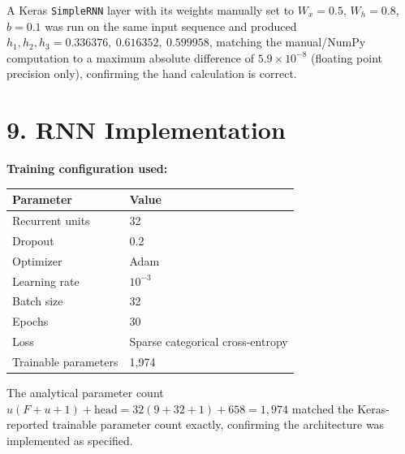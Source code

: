 \documentclass[10pt]{article}
\begin{document}
A Keras \texttt{SimpleRNN} layer with its weights manually set to
$W_x=0.5$, $W_h=0.8$, $b=0.1$ was run on the same input sequence and produced
$h_1,h_2,h_3 = 0.336376,\ 0.616352,\ 0.599958$, matching the manual/NumPy
computation to a maximum absolute difference of $5.9\times10^{-8}$ (floating
point precision only), confirming the hand calculation is correct.

\section*{9. RNN Implementation}

\begin{center}
\end{center}

\textbf{Training configuration used:}

\begin{center}
\begin{tabular}{|l|l|}
\hline
Parameter & Value\\
\hline
Recurrent units & 32\\
Dropout & 0.2\\
Optimizer & Adam\\
Learning rate & $10^{-3}$\\
Batch size & 32\\
Epochs & 30\\
Loss & Sparse categorical cross-entropy\\
Trainable parameters & 1{,}974\\
\hline
\end{tabular}
\end{center}

The analytical parameter count $u(F+u+1)+\text{head}=32(9+32+1)+658=1{,}974$
matched the Keras-reported trainable parameter count exactly, confirming the
architecture was implemented as specified.
\end{document}
